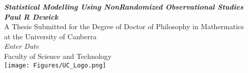 %
%
\begin{titlepage}
\begin{center}
\Huge \textbf{\emph{Statistical Modelling Using NonRandomized Observational Studies}}
\\[30mm]
\LARGE \textbf{\emph{Paul R Dewick}} \\[50mm]
\large A Thesis Submitted for the Degree of Doctor of Philosophy in Mathermatics \\ at the University of Canberra\\[30mm]
\emph{Enter Date} \\[10mm]
Faculty of Science and Technology\\[10mm]
%
\texttt{[image: Figures/UC\_Logo.png]}
\end{center}

%
%
\end{titlepage}

